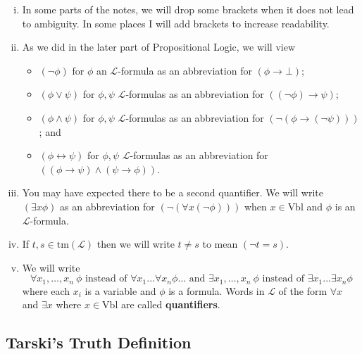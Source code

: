 \documentclass[11pt]{article}
\newcommand{\tm}{\textrm{tm}}
\newcommand{\Vbl}{\textrm{Vbl}}
\newcommand{\mcal}[1]{\mathcal{#1}}
\begin{document}
\begin{enumerate}[(i)]
\item In some parts of the notes, we will drop some brackets when it does not lead to ambiguity. In some places I will add brackets to increase readability.
\item
As we did in the later part of Propositional Logic, we will view
\begin{itemize}
\item $(\neg\phi)$ for $\phi$ an $\mcal{L}$-formula as an abbreviation for $(\phi\rightarrow \bot)$;
\item $(\phi\vee \psi)$ for $\phi,\psi$ $\mcal{L}$-formulas as an abbreviation for $((\neg \phi)\rightarrow \psi)$;
\item $(\phi\wedge \psi)$ for $\phi,\psi$ $\mcal{L}$-formulas as an abbreviation for $(\neg(\phi\rightarrow (\neg \psi)))$; and
\item $(\phi\leftrightarrow \psi)$ for $\phi,\psi$ $\mcal{L}$-formulas as an abbreviation for $((\phi\rightarrow \psi)\wedge(\psi\rightarrow \phi))$.
\end{itemize}
\item You may have expected there to be a second quantifier. We will write $(\exists x \phi)$ as an abbreviation for $(\neg(\forall x(\neg\phi)))$ when $x\in\textrm{Vbl}$ and $\phi$ is an $\mcal{L}$-formula.
\item If $t,s\in\tm(\mcal{L})$ then we will write $t\neq s$ to mean $(\neg t=s)$.
\item We will write
\[\forall x_1,\ldots,x_n\ \phi \text { instead of }\forall x_1...\forall x_n\phi\ldots \text { and }
\exists x_1,\ldots,x_n\ \phi \text { instead of }\exists x_1...\exists x_n\phi \]
where each $x_i$ is a variable and $\phi$ is a formula. Words in $\mcal{L}$ of the form $\forall x$ and $\exists x$ where $x\in\Vbl$ are called \textbf{quantifiers}.
\end{enumerate}

\subsection{Tarski's Truth Definition}
\end{document}
